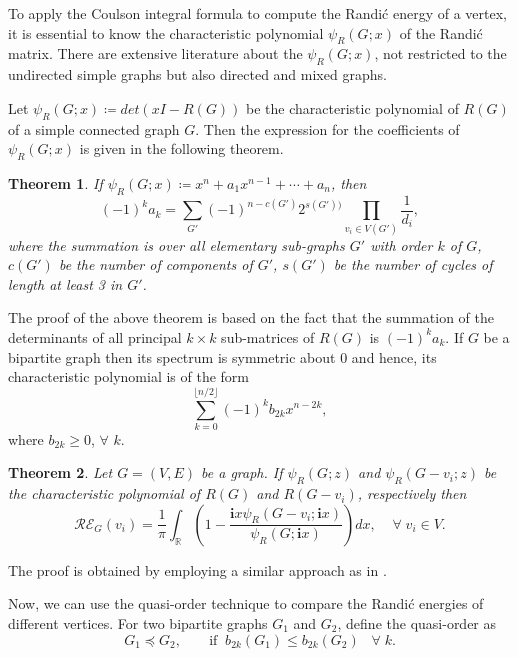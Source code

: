 \documentclass[10 pt]{article}
\newtheorem{theorem}{Theorem}[section]
\numberwithin{equation}{section}
\begin{document}
To apply the Coulson integral formula to compute the Randi\'c energy of a vertex, it is essential to know the characteristic polynomial $\psi_R(G;x)$ of the Randi\'c matrix. There are extensive literature about the $\psi_R(G;x)$, not restricted to the undirected simple graphs but also directed and mixed graphs.

Let $\psi_R(G;x)\coloneqq det(xI-R(G))$ be the characteristic polynomial of $R(G)$ of a simple connected graph $G$. Then the expression for the coefficients of $\psi_R(G;x)$ is given in the following theorem.

\begin{theorem}\cite{Lu2017, Bharali}
If $\psi_R(G;x)\coloneqq x^n+a_1x^{n-1}+\cdots+a_n$, then
$$(-1)^ka_k=\sum\limits_{G'}(-1)^{n-c(G')}2^{s(G'))}\prod_{v_i\in V(G')}\frac{1}{d_i},$$
where the summation is over all elementary sub-graphs $G'$ with order $k$ of $G$, $c(G')$ be the number of components of $G'$, $s(G')$ be the number of cycles of length at least 3 in $G'$.
\end{theorem}
The proof of the above theorem is based on the fact that the summation of the determinants of all principal $k\times k$ sub-matrices of $R(G)$ is $(-1)^ka_k$. If $G$ be a bipartite graph then its spectrum is symmetric about 0 and hence, its characteristic polynomial is of the form
$$\sum_{k=0}^{\lfloor n/2 \rfloor} (-1)^kb_{2k}x^{n-2k},$$
where $b_{2k} \geq 0$, $\forall$ $k$. \\



\begin{theorem}\label{Coulson integral formula to energy of a vertex}
Let $G=(V,E)$ be a graph. If $\psi_R(G;z)$ and $\psi_R(G-v_i;z)$ be the characteristic polynomial of $R(G)$ and $R(G-v_i)$, respectively then
$$\mathcal{RE}_{G}(v_i) = \frac{1}{\pi} \int_{\mathbb{R}} \left(1 - \frac{\mathbf{i}x \psi_R(G-v_i;\mathbf{i}x) }{\psi_R(G;\mathbf{i}x)}\right)dx,\;\;\;\;\forall\; v_i\in V.$$
\end{theorem}

The proof is obtained by employing a similar approach as in \cite{Arizmendi2019}.


Now, we can use the quasi-order technique to compare the Randi\'c energies of different vertices. For two bipartite graphs $G_1$ and $G_2$, define the quasi-order as
$$G_1 \preceq G_2, \;\;\;\;\;\;\;\text{if} \;\; b_{2k}(G_1) \leq b_{2k}(G_2)\;\;\;\forall\;k.$$
\end{document}
